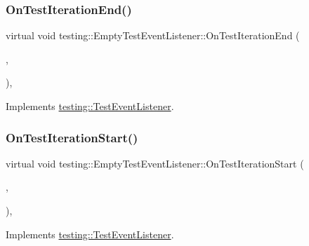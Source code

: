 \subsubsection{\texorpdfstring{OnTestIterationEnd()}{OnTestIterationEnd()}}
{\footnotesize\ttfamily virtual void testing\+::\+Empty\+Test\+Event\+Listener\+::\+On\+Test\+Iteration\+End (\begin{DoxyParamCaption}\item[{const \mbox{\hyperlink{classtesting_1_1_unit_test}{Unit\+Test}} \&}]{,  }\item[{int}]{ }\end{DoxyParamCaption})\hspace{0.3cm}{\ttfamily [inline]}, {\ttfamily [virtual]}}



Implements \mbox{\hyperlink{classtesting_1_1_test_event_listener_a550fdb3e55726e4cefa09f5697941425}{testing\+::\+Test\+Event\+Listener}}.

\mbox{\label{classtesting_1_1_empty_test_event_listener_a836f05829855dc60d13ba99ad712c0dd}} 
\subsubsection{\texorpdfstring{OnTestIterationStart()}{OnTestIterationStart()}}
{\footnotesize\ttfamily virtual void testing\+::\+Empty\+Test\+Event\+Listener\+::\+On\+Test\+Iteration\+Start (\begin{DoxyParamCaption}\item[{const \mbox{\hyperlink{classtesting_1_1_unit_test}{Unit\+Test}} \&}]{,  }\item[{int}]{ }\end{DoxyParamCaption})\hspace{0.3cm}{\ttfamily [inline]}, {\ttfamily [virtual]}}



Implements \mbox{\hyperlink{classtesting_1_1_test_event_listener_a60cc09b7907cb329d152eb5e7133bdeb}{testing\+::\+Test\+Event\+Listener}}.

\mbox{\label{classtesting_1_1_empty_test_event_listener_a59e7f7d9f2e2d089a6e8c1e2577f4718}} 
